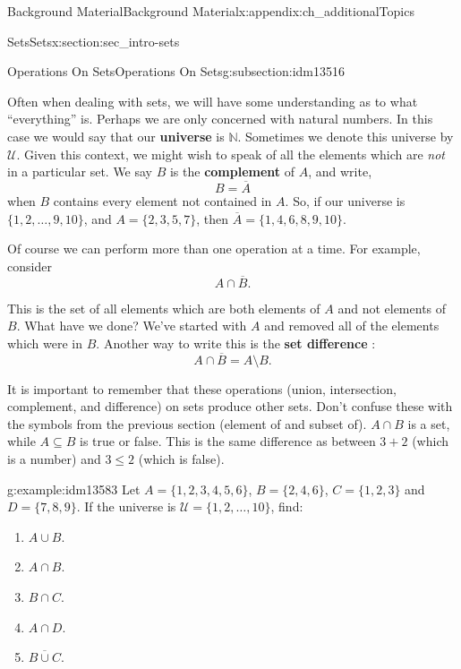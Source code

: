 \documentclass[oneside,10pt,]{book}
\newcommand{\terminology}[1]{\textbf{#1}}
\numberwithin{equation}{chapter}
\def\N{\mathbb N}
\def\U{\mathcal U}
\begin{document}
\begin{appendixptx}{Background Material}{}{Background Material}{}{}{x:appendix:ch_additionalTopics}
\begin{sectionptx}{Sets}{}{Sets}{}{}{x:section:sec_intro-sets}
\begin{subsectionptx}{Operations On Sets}{}{Operations On Sets}{}{}{g:subsection:idm13516}
\par
Often when dealing with sets, we will have some understanding as to what ``everything'' is. Perhaps we are only concerned with natural numbers. In this case we would say that our \terminology{universe} is \(\N\). Sometimes we denote this universe by \(\U\). Given this context, we might wish to speak of all the elements which are \emph{not} in a particular set. We say \(B\) is the \terminology{complement}  of \(A\), and write,%
\begin{equation*}
B = \overline A
\end{equation*}
when \(B\) contains every element not contained in \(A\). So, if our universe is \(\{1, 2,\ldots, 9, 10\}\), and \(A = \{2, 3, 5, 7\}\), then \(\overline A = \{1, 4, 6, 8, 9,10\}\).%
\par
Of course we can perform more than one operation at a time. For example, consider%
\begin{equation*}
A \cap \overline B.
\end{equation*}
%
\par
This is the set of all elements which are both elements of \(A\) and not elements of \(B\). What have we done? We've started with \(A\) and removed all of the elements which were in \(B\). Another way to write this is the \terminology{set difference}  :%
\begin{equation*}
A \cap \overline B = A \setminus B.
\end{equation*}
%
\par
It is important to remember that these operations (union, intersection, complement, and difference) on sets produce other sets. Don't confuse these with the symbols from the previous section (element of and subset of). \(A \cap B\) is a set, while \(A \subseteq B\) is true or false. This is the same difference as between \(3 + 2\) (which is a number) and \(3 \le 2\) (which is false).%
\begin{example}{}{g:example:idm13583}%
Let \(A = \{1, 2, 3, 4, 5, 6\}\), \(B = \{2, 4, 6\}\), \(C = \{1, 2, 3\}\) and \(D = \{7, 8, 9\}\). If the universe is \(\U = \{1, 2, \ldots, 10\}\), find:%
\begin{enumerate}
\item{}\(A \cup B\).%
\item{}\(A \cap B\).%
\item{}\(B \cap C\).%
\item{}\(A \cap D\).%
\item{}\(\overline{B \cup C}\).%

\end{enumerate}
\end{example}
\end{subsectionptx}
\end{sectionptx}
\end{appendixptx}
\end{document}
